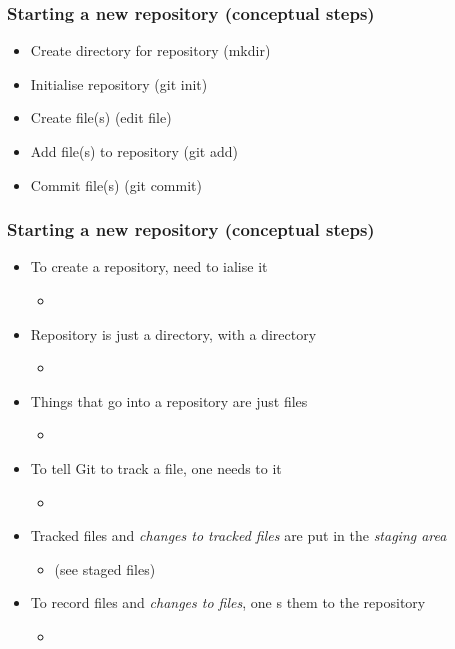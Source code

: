 \documentclass{git_course}
\begin{document}
\begin{frame}
    \frametitle{Starting a new repository (conceptual steps)}
    \begin{itemize}
        \item Create directory for repository (mkdir)
        \item Initialise repository (git init)
        \item Create file(s) (edit file)
        \item Add file(s) to repository (git add)
        \item Commit file(s) (git commit)
    \end{itemize}
\end{frame}

\begin{frame}
\frametitle{Starting a new repository (conceptual steps)}
\begin{itemize}
    \item To create a repository, need to ialise it
        \begin{itemize}
            \item {}
        \end{itemize}
    \item Repository is just a directory, with a  directory
        \begin{itemize}
            \item {}
        \end{itemize}
    \item Things that go into a repository are just files
        \begin{itemize}
            \item {}
        \end{itemize}
    \item To tell Git to track a file, one needs to  it
        \begin{itemize}
            \item {}
        \end{itemize}
    \item Tracked files and \emph{changes to tracked files} are put in
        the \emph{staging area}
        \begin{itemize}
            \item {} (see staged files)
        \end{itemize}
    \item To record files and \emph{changes to files}, one s
        them to the repository
        \begin{itemize}
            \item {}
        \end{itemize}
\end{itemize}
\end{frame}
\end{document}
